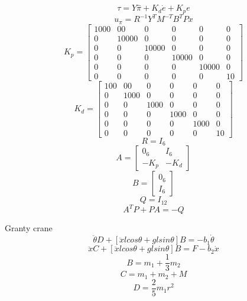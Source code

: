 \documentclass[a4paper]{article}
\begin{document}
\begin{equation}
\tau = Y \hat{\pi} + K_d\dot{e} + K_p e
\end{equation}
\begin{equation}
u_{\pi} = R^{-1} Y^T M^{-T} B^T P x
\end{equation}
\begin{equation}
K_p = 
\begin{bmatrix}
1000 & 00 & 0	& 0 & 0 & 0 \\
0 & 10000 & 0 & 0 & 0 & 0 \\
0 & 0 & 10000 & 0 & 0 & 0 \\
0 & 0 & 0 & 10000 & 0 & 0 \\
0 & 0 & 0 & 0 & 10000 & 0 \\
0 & 0 & 0 & 0 & 0 & 10
\end{bmatrix}
\end{equation}
\begin{equation}
K_d = 
\begin{bmatrix}
100 & 00 & 0	& 0 & 0 & 0 \\
0 & 1000 & 0 & 0 & 0 & 0 \\
0 & 0 & 1000 & 0 & 0 & 0 \\
0 & 0 & 0 & 1000 & 0 & 0 \\
0 & 0 & 0 & 0 & 1000 & 0 \\
0 & 0 & 0 & 0 & 0 & 10
\end{bmatrix}
\end{equation}
\begin{equation}
R = I_{6}
\end{equation}
\begin{equation}
A = 
\begin{bmatrix}
0_{6} & I_{6} \\
-K_p & -K_d 
\end{bmatrix}
\end{equation}
\begin{equation}
B = 
\begin{bmatrix}
0_{6} \\
I_{6}
\end{bmatrix}
\end{equation}
\begin{equation}
Q = I_{12}
\end{equation}
\begin{equation}
A^T P + P A = -Q
\end{equation}

Granty crane
\begin{equation}
\ddot{\theta}D  + [\ddot{x}lcos\theta + glsin\theta] B = -b_1 \dot{\theta}
\end{equation}
\begin{equation}
\ddot{x}C  + [\ddot{x}lcos\theta + glsin\theta] B = F - b_2 \dot{x}
\end{equation}
\begin{equation}
B = m_1 + \frac{1}{3}m_2
\end{equation}
\begin{equation}
C = m_1 + m_2 + M
\end{equation}
\begin{equation}
D = \frac{2}{5}m_1r^2
\end{equation}
\end{document}
